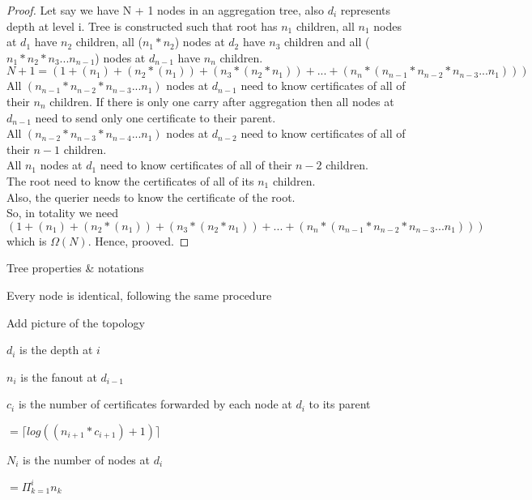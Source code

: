 \begin{proof}

	Let say we have N + 1 nodes in an aggregation tree, also $d_{i}$ represents depth at level i. Tree is constructed such that root has $n_{1}$ children, all $n_{1}$ nodes at $d_{1}$ have $n_{2}$ children, all ($n_{1} * n_{2}$)  nodes at $d_{2}$ have $n_{3}$ children and all ($n_{1} * n_{2} * n_{3} ... n_{n-1}$) nodes at $d_{n-1}$ have $n_{n}$ children.\\
	$ N + 1 = (1 + (n_{1}) + (n_{2} * (n_{1})) + (n_{3} * (n_{2} * n_{1})) + ... + (n_{n} * (n_{n-1} * n_{n-2} * n_{n-3} ... n_{1}) ) ) $\\
	
	All $ (n_{n-1} * n_{n-2} * n_{n-3} ... n_{1}) $ nodes at $ d_{n-1} $ need to know certificates of all of their $n_{n}$ children.
	If there is only one carry after aggregation then all nodes at $d_{n-1}$ need to send only one certificate to their parent.\\
	All $ (n_{n-2} * n_{n-3} * n_{n-4} ... n_{1}) $ nodes at $ d_{n-2} $ need to know certificates of all of their $ n-1 $ children.\\
	All $ n_{1} $ nodes at $ d_{1} $ need to know certificates of all of their $ n-2 $ children.\\
	The root need to know the certificates of all of its $ n_{1} $ children.\\
	Also, the querier needs to know the certificate of the root.\\
	So, in totality we need $ (1 + (n_{1}) + (n_{2} * (n_{1})) + (n_{3} * (n_{2} * n_{1})) + ... + (n_{n} * (n_{n-1} * n_{n-2} * n_{n-3} ... n_{1}) ) ) $ which is $\Omega(N)$. Hence, prooved.

\end{proof}

Tree properties \& notations

Every node is identical, following the same procedure

Add picture of the topology

$d_{i}$ is the depth at $i$

$n_{i}$ is the fanout at $d_{i-1}$

$c_{i}$ is the number of certificates forwarded by each node at $d_{i}$ to its parent
 												
 												$= \lceil log((n_{i+1} * c_{i+1}) + 1) \rceil$

$N_{i}$ is the number of nodes at $d_{i}$  

												$= \Pi_{k=1}^i n_k$

